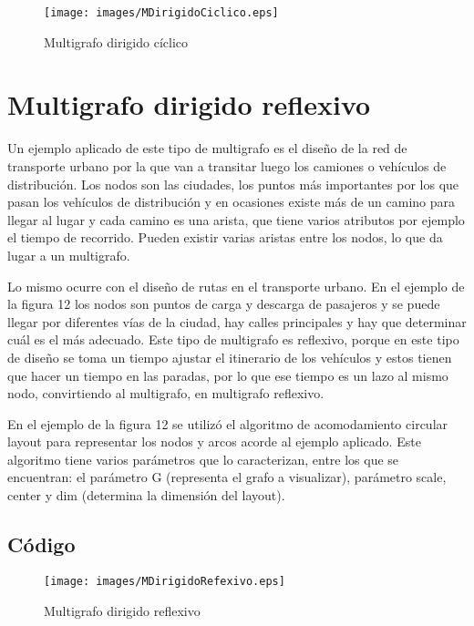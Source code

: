 \documentclass{article}
\begin{document}
\begin{figure}[H]
\centering
\texttt{[image: images/MDirigidoCiclico.eps]}
\caption{Multigrafo dirigido cíclico}
\end{figure}

\section{Multigrafo dirigido reflexivo}

Un ejemplo aplicado de este tipo de multigrafo es el diseño de la red de transporte urbano por la que van a transitar luego los camiones o vehículos de distribución. Los nodos son las ciudades, los puntos más importantes por los que pasan los vehículos de distribución y en ocasiones existe más de un camino para llegar al lugar y cada camino es una arista, que tiene varios atributos por ejemplo el tiempo de recorrido. Pueden existir varias aristas entre los nodos, lo que da lugar a un multigrafo.  

Lo mismo ocurre con el diseño de rutas en el transporte urbano. En el ejemplo de la figura 12 los nodos son puntos de carga y descarga de pasajeros y se puede llegar por diferentes vías de la ciudad, hay calles principales y hay que determinar cuál es el más adecuado. Este tipo de multigrafo es reflexivo, porque en este tipo de diseño se toma un tiempo ajustar el itinerario de los vehículos y estos tienen que hacer un tiempo en las paradas, por lo que ese tiempo es un lazo al mismo nodo, convirtiendo al multigrafo, en multigrafo reflexivo. 

En el ejemplo de la figura 12 se utilizó el algoritmo de acomodamiento circular layout para representar los nodos y arcos acorde al ejemplo aplicado. Este algoritmo tiene varios parámetros que lo caracterizan, entre los que se encuentran: el parámetro G (representa el grafo a visualizar), parámetro scale, center y dim (determina la dimensión del layout).

\subsection{Código}



\begin{figure}[H]
\centering
\texttt{[image: images/MDirigidoRefexivo.eps]}
\caption{Multigrafo dirigido reflexivo}
\end{figure}



\end{document}
